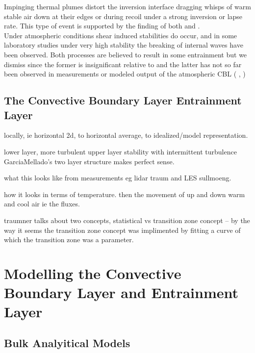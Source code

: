 Impinging thermal plumes distort the inversion interface dragging whisps of warm stable air down
at their edges or during recoil under a strong inversion or lapse rate. This type of event is supported 
by the finding  of both  \cite{SullMoengStev} and \citeauthor{Traum11} \cite{Traum11}.\\

Under atmospheric conditions shear induced stabilities do occur, and in some laboratory studies 
under very high stability the breaking of internal waves have been observed.  Both processes are 
believed to result in some entrainment but we dismiss since the former is insignificant relative
to and the latter has not so far been observed in measurements or modeled output of the 
atmospheric \acs{CBL} (\citeauthor{Traum11} \cite{Traum11},  \cite{SullMoengStev})

\subsection{The Convective Boundary Layer Entrainment Layer}
\label{subsec:}

locally, ie horizontal 2d, to horizontal average, to idealized/model representation.

lower layer, more turbulent upper layer stability with intermittent turbulence
GarciaMellado's two layer structure makes perfect sense.

what this looks like from measurements eg lidar traum and LES sullmoeng.

how it looks in terms of temperature.  then the movement of up and down warm and cool air ie the 
fluxes.  

traumner talks about two concepts, statistical vs transition zone concept -- by the way it seems the transition zone concept
was implimented by fitting a curve of which the transition zone was a parameter.

\section{Modelling the Convective Boundary Layer and Entrainment Layer}
\label{sec:}

\subsection{Bulk Analyitical Models}
\label{subsec:}

